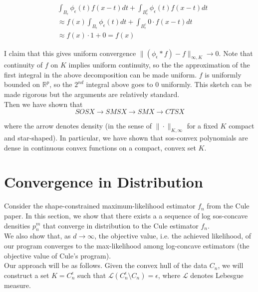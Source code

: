 \documentclass[11pt,reqno]{amsart}
\theoremstyle{definition}
\numberwithin{equation}{section}
\newcommand{\eps}{\epsilon}
\newcommand{\mc}{\mathcal}
\newcommand{\mr}{\mathbb{R}}
\begin{document}
\begin{align*}
&\int_{B_{\eps}} \phi_{\eps}(t) f(x - t) dt + \int_{B_{\eps}^c} \phi_{\eps}(t) f(x - t) dt\\
&\approx f(x) \int_{B_{\eps}} \phi_{\eps}(t) dt + \int_{B_{\eps}^c} 0 \cdot f(x -t) dt \\
&\approx f(x) \cdot 1 + 0 = f(x)
\end{align*}

I claim that this gives uniform convergence $\|(\phi_{\eps} \ast f) - f\|_{\infty, K} \to 0$. Note that continuity of $f$ on $K$ implies uniform continuity, so the the approximation of the first integral in the above decomposition can be made uniform. $f$ is uniformly bounded on $\mr^p$, so the $2^{nd}$ integral above goes to $0$ uniformly. This sketch can be made rigorous but the arguments are relatively standard. \\

Then we have shown that \\

\[
SOSX \longrightarrow SMSX \longrightarrow SMX \longrightarrow CTSX
\]

where the arrow denotes density (in the sense of $\| \cdot \|_{K,\infty}$ for a fixed $K$ compact and star-shaped). In particular, we have shown that sos-convex polynomials are dense in continuous convex functions on a compact, convex set $K$. \\

\section{Convergence in Distribution}

Consider the shape-constrained maximum-likelihood estimator $f_n$ from the Cule paper. In this section, we show that there exists a a sequence of log sos-concave densities $p_n^m$ that converge in distribution to the Cule estimator $f_n$. \\

We also show that, as $d \to \infty$, the objective value, i.e. the achieved likelihood, of our program converges to the max-likelihood among log-concave estimators (the objective value of Cule's program). \\

Our approach will be as follows. Given the convex hull of the data $C_n$, we will construct a set $K = C_n^{\eps}$ such that $\mc{L}(C_n^{\eps} \setminus C_n) = \eps$, where $\mc{L}$ denotes Lebesgue measure. \\
\end{document}
